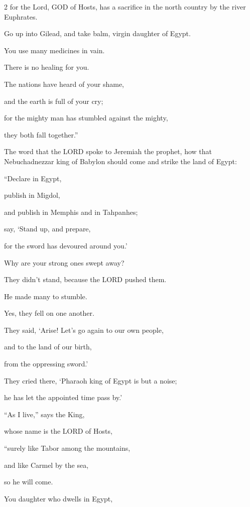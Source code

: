 \begin{multicols}{2}
for the Lord, GOD of Hosts, has a sacrifice in the north country by the river
Euphrates.


\myverse{}Go up into Gilead, and take balm, virgin daughter of Egypt.

You use many medicines in vain.

There is no healing for you.


\myverse{}The nations have heard of your shame,

and the earth is full of your cry;

for the mighty man has stumbled against the mighty,

they both fall together.”

\vspace{\baselineskip}

\myverse{}The word that the LORD spoke to Jeremiah the prophet, how that
Nebuchadnezzar king of Babylon should come and strike the land of Egypt:


\myverse{}“Declare in Egypt,

publish in Migdol,

and publish in Memphis and in Tahpanhes;

say, ‘Stand up, and prepare,

for the sword has devoured around you.’


\myverse{}Why are your strong ones swept away?

They didn’t stand, because the LORD pushed them.


\myverse{}He made many to stumble.

Yes, they fell on one another.

They said, ‘Arise! Let’s go again to our own people,

and to the land of our birth,

from the oppressing sword.’


\myverse{}They cried there, ‘Pharaoh king of Egypt is but a noise;

he has let the appointed time pass by.’

\vspace{\baselineskip}

\myverse{}“As I live,” says the King,

whose name is the LORD of Hosts,

“surely like Tabor among the mountains,

and like Carmel by the sea,

so he will come.


\myverse{}You daughter who dwells in Egypt,


\end{multicols}
